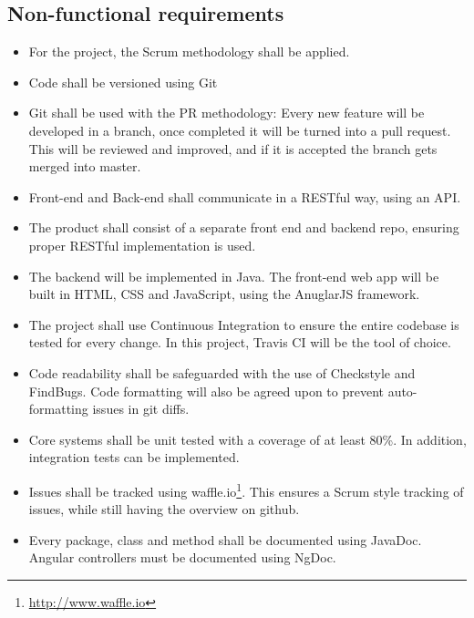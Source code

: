 \subsection{Non-functional requirements}
\begin{itemize}

\item For the project, the Scrum methodology shall be applied.

\item Code shall be versioned using Git

\item Git shall be used with the PR methodology: Every new feature will be developed in a branch, once completed it will be turned into a pull request. This will be reviewed and improved, and if it is accepted the branch gets merged into master.

\item Front-end and Back-end shall communicate in a RESTful way, using an API.

\item The product shall consist of a separate front end and backend repo, ensuring proper RESTful implementation is used.

\item The backend will be implemented in Java. The front-end web app will be built in \gls{HTML}, \gls{CSS} and \gls{JavaScript}, using the \gls{AnuglarJS} framework. 

\item The project shall use Continuous Integration to ensure the entire codebase is tested for every change. In this project, \gls{Travis CI} will be the tool of choice.

\item Code readability shall be safeguarded with the use of Checkstyle and FindBugs. Code formatting will also be agreed upon to prevent auto-formatting issues in git diffs.

\item Core systems shall be unit tested with a coverage of at least 80\%. In addition, integration tests can be implemented.

\item Issues shall be tracked using waffle.io\footnote{\url{http://www.waffle.io}}. This ensures a Scrum style tracking of issues, while still having the overview on github.

\item Every package, class and method shall be documented using JavaDoc. Angular controllers must be documented using NgDoc. 

\end{itemize}
